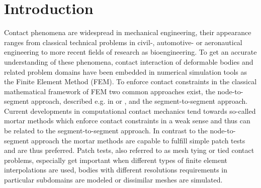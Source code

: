 \chapter{Introduction} %
\label{cha:introduction}



Contact phenomena are widespread in mechanical engineering, their appearance ranges from classical technical problems in civil-, automotive- or aeronautical engineering to more recent fields of research as bioengineering. To get an accurate understanding of these phenomena, contact interaction of deformable bodies and related problem domains have been embedded in numerical simulation tools as the Finite Element Method (FEM). To enforce contact constraints in the classical mathematical framework of FEM two common approaches exist, the node-to-segment approach, described e.g. in \citet{laursen1993} or \citet{zavarise2009}, and the segment-to-segment approach. Current developments in computational contact mechanics tend towards so-called mortar methods which enforce contact constraints in a weak sense and thus can be related to the segment-to-segment approach. In contrast to the node-to-segment approach the mortar methods are capable to fulfill simple patch tests and are thus preferred. Patch tests, also referred to as mesh tying or tied contact problems, especially get important when different types of finite element interpolations are used, bodies with different resolutions requirements in particular subdomains are modeled or dissimilar meshes are simulated.

